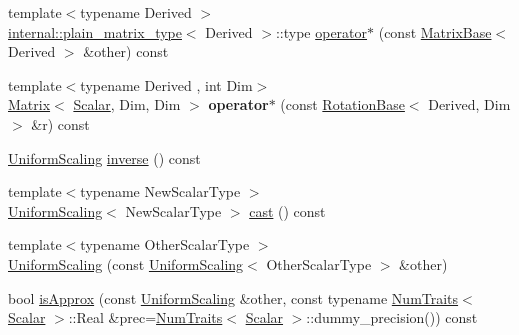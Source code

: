 \begin{DoxyCompactItemize}
\item 
{\footnotesize template$<$typename Derived $>$ }\\\hyperlink{struct_eigen_1_1internal_1_1plain__matrix__type}{internal\+::plain\+\_\+matrix\+\_\+type}$<$ Derived $>$\+::type \hyperlink{class_eigen_1_1_uniform_scaling_a1caa980503c4bba685aa65b419cad64b}{operator$\ast$} (const \hyperlink{group___core___module_class_eigen_1_1_matrix_base}{Matrix\+Base}$<$ Derived $>$ \&other) const
\item 
\mbox{\label{class_eigen_1_1_uniform_scaling_a991e1de828f897a9d6f706fe9d129387}} 
{\footnotesize template$<$typename Derived , int Dim$>$ }\\\hyperlink{group___core___module_class_eigen_1_1_matrix}{Matrix}$<$ \hyperlink{class_eigen_1_1_uniform_scaling_a04c4339f58f1210c5d4d34b1bd7ae283}{Scalar}, Dim, Dim $>$ {\bfseries operator$\ast$} (const \hyperlink{class_eigen_1_1_rotation_base}{Rotation\+Base}$<$ Derived, Dim $>$ \&r) const
\item 
\hyperlink{class_eigen_1_1_uniform_scaling}{Uniform\+Scaling} \hyperlink{class_eigen_1_1_uniform_scaling_a60dba22bebe9e2c97cfbc76f85eb1b78}{inverse} () const
\item 
{\footnotesize template$<$typename New\+Scalar\+Type $>$ }\\\hyperlink{class_eigen_1_1_uniform_scaling}{Uniform\+Scaling}$<$ New\+Scalar\+Type $>$ \hyperlink{class_eigen_1_1_uniform_scaling_af93a9ee1d6efc102b65a197f3ea3d4cd}{cast} () const
\item 
{\footnotesize template$<$typename Other\+Scalar\+Type $>$ }\\\hyperlink{class_eigen_1_1_uniform_scaling_a898cc0c97625ce671d7ea951f6eb2fc4}{Uniform\+Scaling} (const \hyperlink{class_eigen_1_1_uniform_scaling}{Uniform\+Scaling}$<$ Other\+Scalar\+Type $>$ \&other)
\item 
bool \hyperlink{class_eigen_1_1_uniform_scaling_a7f736fdbe43f7bce3d277312efdc315e}{is\+Approx} (const \hyperlink{class_eigen_1_1_uniform_scaling}{Uniform\+Scaling} \&other, const typename \hyperlink{group___core___module_struct_eigen_1_1_num_traits}{Num\+Traits}$<$ \hyperlink{class_eigen_1_1_uniform_scaling_a04c4339f58f1210c5d4d34b1bd7ae283}{Scalar} $>$\+::Real \&prec=\hyperlink{group___core___module_struct_eigen_1_1_num_traits}{Num\+Traits}$<$ \hyperlink{class_eigen_1_1_uniform_scaling_a04c4339f58f1210c5d4d34b1bd7ae283}{Scalar} $>$\+::dummy\+\_\+precision()) const
\item 

\end{DoxyCompactItemize}
